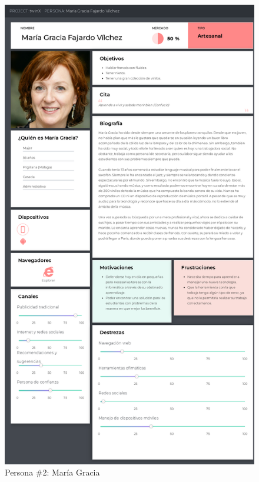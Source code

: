 \begin{figure}
	\centering
	\includegraphics[width=\textwidth, height=\textheight, keepaspectratio]{img/Personas/MGracia}
	\caption[Persona \#2]{Persona \#2: María Gracia}
	\label{fig:persona2}
\end{figure}
